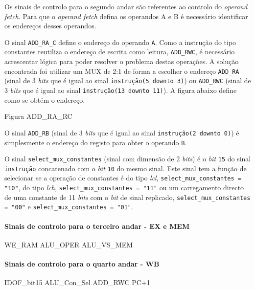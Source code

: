 \documentclass[11pt]{article}
\numberwithin{equation}{section}
\begin{document}
Os sinais de controlo para o segundo andar são referentes ao controlo do \textit{operand fetch}. Para que o \textit{operand fetch} defina os operandos A e B é necessário identificar os endereços desses operandos.

O sinal \texttt{ADD\_RA\_C} define o endereço do operando \texttt{A}. Como a instrução do tipo constantes reutiliza o endereço de escrita como leitura, \texttt{ADD\_RWC}, é necessário acrescentar lógica para poder resolver o problema destas operações. A solução encontrada foi utilizar um MUX de 2:1 de forma a escolher o endereço \texttt{ADD\_RA} (sinal de 3 \textit{bits} que é igual ao sinal \texttt{instrução(5 {\footnotesize downto} 3)}) ou \texttt{ADD\_RWC} (sinal de 3 \textit{bits} que é igual ao sinal \texttt{instrução(13 {\footnotesize downto} 11)}). A figura abaixo define como se obtém o endereço.

Figura ADD\_RA\_RC

O sinal \texttt{ADD\_RB} (sinal de 3 \textit{bits} que é igual ao sinal \texttt{instrução(2 {\footnotesize downto} 0)}) é simplesmente o endereço do registo para obter o operando \texttt{B}. 

O sinal \texttt{select\_mux\_constantes} (sinal com dimensão de 2 \textit{bits}) é o \textit{bit} \texttt{15} do sinal \texttt{instrução}  concatenado com o \textit{bit} \texttt{10} do mesmo sinal. Este sinal tem a função de selecionar se a operação de constantes é do tipo \textit{lcl}, \texttt{select\_mux\_constantes = "10"}, do tipo \textit{lch}, \texttt{select\_mux\_constantes = "11"} ou um carregamento directo de uma constante de 11 \textit{bits} com o \textit{bit} de sinal replicado, \texttt{select\_mux\_constantes = "00"} e \texttt{select\_mux\_constantes = "01"}. 

\paragraph{Sinais de controlo para o terceiro andar - EX e MEM}
WE\_RAM ALU\_OPER ALU\_VS\_MEM 


\paragraph{Sinais de controlo para o quarto andar - WB}
IDOF\_bit15 ALU\_Con\_Sel ADD\_RWC PC+1
	

\end{document}
